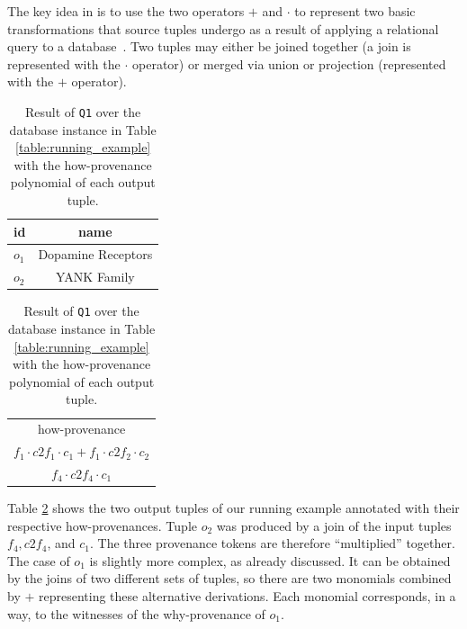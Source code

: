\documentclass[preprint,12pt,sort&compress]{elsarticle}
\newcommand{\scream}[1]{{\bf * #1 *}{\typeout{#1}}}
\begin{document}
The key idea in \citet{howProvenanceGreen} is to use the two operators $+$ and $\cdot$ to represent two basic transformations that source tuples undergo as a result of applying a relational query to a database~\citep{CheneyProvSurvey}. 
Two tuples may either be joined together (a join is represented with the $\cdot$ operator) or merged via union or projection (represented with the $+$ operator).

 

\begin{table}[]
\centering
  \begin{tabular}{|l||c|}
  \hline
    id & name\\
    \hline
    $o_1$ &  Dopamine Receptors\\
    $o_2$ & YANK Family\\
    \hline
  \end{tabular}
  \begin{tabular}{c}
  	how-provenance   \\
  	$f_1 \cdot c2f_1 \cdot c_1 + f_1 \cdot c2f_2 \cdot c_2$ \\
  	$f_4 \cdot c2f_4 \cdot c_1$ \\
  \end{tabular}
    \caption{Result of \texttt{Q1} over the database instance in Table \ref{table:running_example} with the  how-provenance polynomial of each output tuple.}
  \label{table:result_how_prov}
\end{table} 

Table \ref{table:result_how_prov} shows the two output tuples of our running example annotated with their respective how-provenances. 
Tuple $o_2$ was produced by a join of the input tuples $f_4, c2f_4$, and $c_1$. The three provenance tokens are therefore  ``multiplied'' together. 
The case of $o_1$ is slightly more complex, as already discussed.
It can be obtained by the joins of two different sets of tuples, so there are two monomials combined by $+$ representing these alternative derivations. Each monomial corresponds, in a way, to the witnesses of the why-provenance of $o_1$.
\end{document}
